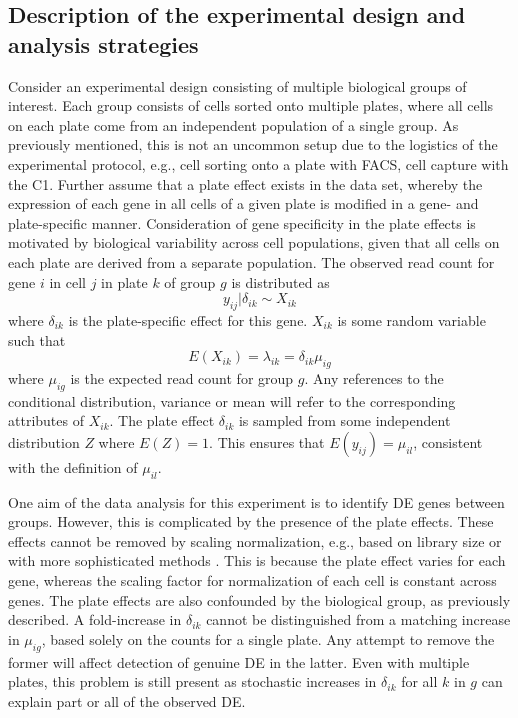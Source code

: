 \documentclass{article}
\begin{document}
\subsection{Description of the experimental design and analysis strategies}
Consider an experimental design consisting of multiple biological groups of interest.
Each group consists of cells sorted onto multiple plates, where all cells on each plate come from an independent population of a single group.
As previously mentioned, this is not an uncommon setup due to the logistics of the experimental protocol, e.g., cell sorting onto a plate with FACS, cell capture with the C1.
Further assume that a plate effect exists in the data set, whereby the expression of each gene in all cells of a given plate is modified in a gene- and plate-specific manner.
Consideration of gene specificity in the plate effects is motivated by biological variability across cell populations, 
    given that all cells on each plate are derived from a separate population.
The observed read count for gene $i$ in cell $j$ in plate $k$ of group $g$ is distributed as 
\[
    y_{ij} | \delta_{ik}  \sim X_{ik}
\]
where $\delta_{ik}$ is the plate-specific effect for this gene.
$X_{ik}$ is some random variable such that 
\[
    E(X_{ik}) = \lambda_{ik} = \delta_{ik}\mu_{ig}
\]
where $\mu_{ig}$ is the expected read count for group $g$. 
Any references to the conditional distribution, variance or mean will refer to the corresponding attributes of $X_{ik}$.
The plate effect $\delta_{ik}$ is sampled from some independent distribution $Z$ where $E(Z) = 1$.
This ensures that $E(y_{ij}) = \mu_{il}$, consistent with the definition of $\mu_{il}$.

One aim of the data analysis for this experiment is to identify DE genes between groups.
However, this is complicated by the presence of the plate effects.
These effects cannot be removed by scaling normalization, e.g., based on library size or with more sophisticated methods \cite{anders2010differential,robinson2010scaling}.
This is because the plate effect varies for each gene, whereas the scaling factor for normalization of each cell is constant across genes.
The plate effects are also confounded by the biological group, as previously described.
A fold-increase in $\delta_{ik}$ cannot be distinguished from a matching increase in $\mu_{ig}$, based solely on the counts for a single plate.
Any attempt to remove the former will affect detection of genuine DE in the latter.
Even with multiple plates, this problem is still present as stochastic increases in $\delta_{ik}$ for all $k$ in $g$ can explain part or all of the observed DE.
\end{document}
